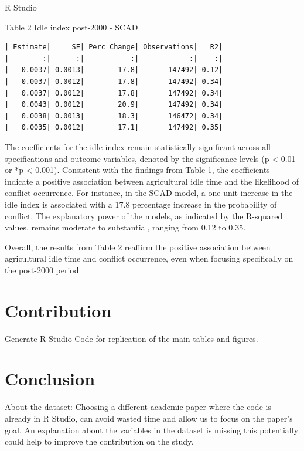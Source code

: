 \documentclass[12pt,letterpaper]{article}
\begin{document}
R Studio

Table 2 Idle index post-2000 - SCAD
\begin{verbatim}
| Estimate|     SE| Perc Change| Observations|   R2|
|--------:|------:|-----------:|------------:|----:|
|   0.0037| 0.0013|        17.8|       147492| 0.12|
|   0.0037| 0.0012|        17.8|       147492| 0.34|
|   0.0037| 0.0012|        17.8|       147492| 0.34|
|   0.0043| 0.0012|        20.9|       147492| 0.34|
|   0.0038| 0.0013|        18.3|       146472| 0.34|
|   0.0035| 0.0012|        17.1|       147492| 0.35|
\end{verbatim}

The coefficients for the idle index remain statistically significant across all specifications and outcome variables, denoted by the significance levels (p < 0.01 or *p < 0.001).
Consistent with the findings from Table 1, the coefficients indicate a positive association between agricultural idle time and the likelihood of conflict occurrence. For instance, in the SCAD model, a one-unit increase in the idle index is associated with a 17.8 percentage increase in the probability of conflict.
The explanatory power of the models, as indicated by the R-squared values, remains moderate to substantial, ranging from 0.12 to 0.35.

Overall, the results from Table 2 reaffirm the positive association between agricultural idle time and conflict occurrence, even when focusing specifically on the post-2000 period

\newpage
\section*{Contribution}

Generate R Studio Code for replication of the main tables and figures. 

\section*{Conclusion}
About the dataset: 
Choosing a different academic paper where the code is already in R Studio, can avoid wasted time and allow us to focus on the paper's goal.
An explanation about the variables in the dataset is missing this potentially could help to improve the contribution on the study. 
\end{document}

